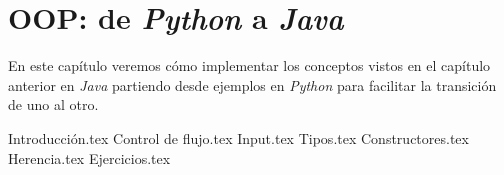 \chapter{OOP: de \textit{Python} a \textit{Java}}
  En este capítulo veremos cómo implementar los conceptos vistos en el capítulo anterior 
  en \textit{Java} partiendo desde ejemplos en \textit{Python} para facilitar la 
  transición de uno al otro.

  {Introducción.tex}
  {Control de flujo.tex}
  {Input.tex}
  {Tipos.tex}
  {Constructores.tex}
  {Herencia.tex}
  {Ejercicios.tex}
%